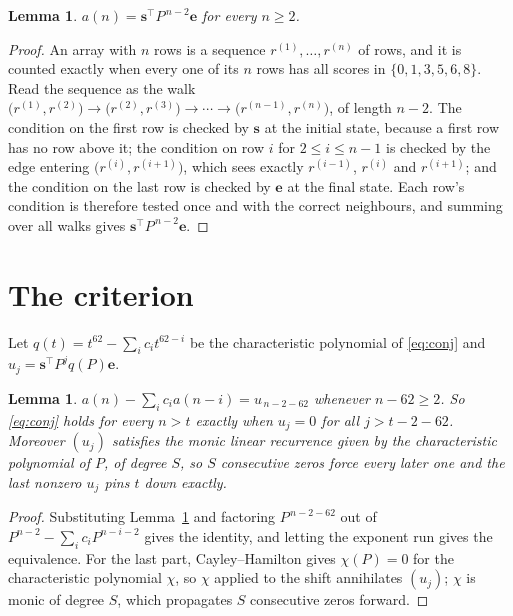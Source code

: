 \documentclass[11pt,a4paper]{article}
\theoremstyle{plain}
\newtheorem{lemma}[theorem]{Lemma}
\theoremstyle{definition}
\begin{document}
\begin{lemma}\label{lem:walk}
$a(n)=\mathbf{s}^{\!\top}P^{\,n-2}\mathbf{e}$ for every $n\ge2$.
\end{lemma}

\begin{proof}
An array with $n$ rows is a sequence $r^{(1)},\dots,r^{(n)}$ of rows, and it is counted
exactly when every one of its $n$ rows has all scores in $\{0,1,3,5,6,8\}$. Read the sequence as the
walk $\bigl(r^{(1)},r^{(2)}\bigr)\to\bigl(r^{(2)},r^{(3)}\bigr)\to\cdots\to
\bigl(r^{(n-1)},r^{(n)}\bigr)$, of length $n-2$. The condition on the first row is
checked by $\mathbf{s}$ at the initial state, because a first row has no row above it; the
condition on row $i$ for $2\le i\le n-1$ is checked by the edge entering
$\bigl(r^{(i)},r^{(i+1)}\bigr)$, which sees exactly $r^{(i-1)}$, $r^{(i)}$ and
$r^{(i+1)}$; and the condition on the last row is checked by $\mathbf{e}$ at the final
state. Each row's condition is therefore tested once and with the correct neighbours, and
summing over all walks gives $\mathbf{s}^{\!\top}P^{\,n-2}\mathbf{e}$.
\end{proof}

\section{The criterion}

Let $q(t)=t^{62}-\sum_i c_i t^{62-i}$ be the characteristic polynomial of
\eqref{eq:conj} and $u_j=\mathbf{s}^{\!\top}P^{j}q(P)\mathbf{e}$.

\begin{lemma}\label{lem:crit}
$a(n)-\sum_i c_i a(n-i)=u_{\,n-2-62}$ whenever $n-62\ge2$. So \eqref{eq:conj}
holds for every $n>t$ exactly when $u_j=0$ for all $j>t-2-62$. Moreover $(u_j)$
satisfies the monic linear recurrence given by the characteristic polynomial of $P$, of
degree $S$, so $S$ consecutive zeros force every later one and the last nonzero $u_j$ pins
$t$ down exactly.
\end{lemma}

\begin{proof}
Substituting Lemma~\ref{lem:walk} and factoring $P^{\,n-2-62}$ out of
$P^{n-2}-\sum_i c_i P^{n-i-2}$ gives the identity, and letting the exponent run gives the
equivalence. For the last part, Cayley--Hamilton gives $\chi(P)=0$ for the characteristic
polynomial $\chi$, so $\chi$ applied to the shift annihilates $(u_j)$; $\chi$ is monic of
degree $S$, which propagates $S$ consecutive zeros forward.
\end{proof}
\end{document}
